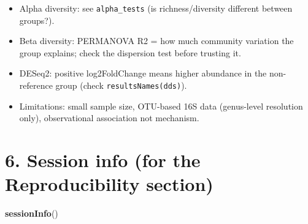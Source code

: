 \documentclass[
]{article}
\newenvironment{Shaded}{\begin{snugshade}}{\end{snugshade}}
\newcommand{\FunctionTok}[1]{\textcolor[rgb]{0.13,0.29,0.53}{\textbf{#1}}}
\newcommand{\NormalTok}[1]{#1}
\providecommand{\tightlist}{%
  \setlength{\itemsep}{0pt}\setlength{\parskip}{0pt}}
\begin{document}
\begin{itemize}
\tightlist
\item
  Alpha diversity: see \texttt{alpha\_tests} (is richness/diversity
  different between groups?).
\item
  Beta diversity: PERMANOVA R2 = how much community variation the group
  explains; check the dispersion test before trusting it.
\item
  DESeq2: positive log2FoldChange means higher abundance in the
  non-reference group (check \texttt{resultsNames(dds)}).
\item
  Limitations: small sample size, OTU-based 16S data (genus-level
  resolution only), observational association not mechanism.
\end{itemize}

\section{6. Session info (for the Reproducibility
section)}\label{session-info-for-the-reproducibility-section}

\begin{Shaded}
\begin{Highlighting}[]
\FunctionTok{sessionInfo}\NormalTok{()}
\end{Highlighting}
\end{Shaded}
\end{document}
